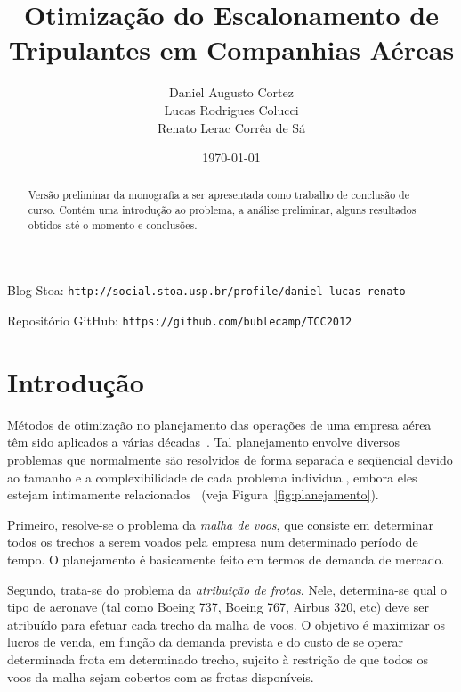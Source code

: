 \documentclass[12pt,a4paper]{article}
\newcommand{\zerar}{\setcounter{equation}{0}\setcounter{figure}{0}\setcounter{table}{0}}
\begin{document}
\title{\bf Otimização do Escalonamento de Tripulantes em Companhias Aéreas}
\author{Daniel Augusto Cortez \\ Lucas Rodrigues Colucci \\ Renato Lerac Corrêa de Sá}
\date{\today}

\maketitle

\begin{abstract}
	Versão preliminar da monografia a ser apresentada como trabalho de conclusão de curso. Contém
	uma introdução ao problema, a análise preliminar, alguns resultados obtidos até o momento e 
	conclusões.
\end{abstract}

\vspace{2cm}

\begin{center}
	Blog Stoa: \verb|http://social.stoa.usp.br/profile/daniel-lucas-renato|

	Repositório GitHub: \verb|https://github.com/bublecamp/TCC2012| 
\end{center}
\thispagestyle{empty}

\newpage 

\tableofcontents

\newpage


\zerar
\section{Introdução}
\label{sec:introducao}

Métodos de otimização no planejamento das operações de uma empresa aérea têm sido aplicados a várias
décadas~\cite{yu}. Tal planejamento envolve diversos problemas que normalmente são resolvidos de
forma separada e seqüencial devido ao tamanho e a complexibilidade de cada problema individual,
embora eles estejam intimamente relacionados~\cite{barnhart03} (veja Figura~\ref{fig:planejamento}).

Primeiro, resolve-se o problema da \emph{malha de voos}, que consiste em determinar todos os trechos
a serem voados pela empresa num determinado período de tempo. O planejamento é basicamente feito em
termos de demanda de mercado.

Segundo, trata-se do problema da \emph{atribuição de frotas}. Nele, determina-se qual o tipo de
aeronave (tal como Boeing 737, Boeing 767, Airbus 320, etc) deve ser atribuído para efetuar cada
trecho da malha de voos. O objetivo é maximizar os lucros de venda, em função da demanda prevista e
do custo de se operar determinada frota em determinado trecho, sujeito à restrição de que todos os
voos da malha sejam cobertos com as frotas disponíveis.
\end{document}
